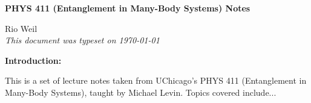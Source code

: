 \documentclass[10pt]{article}
\begin{document}
\begin{tcolorbox}
  \begin{center}
  \begin{Large}
    \textbf{PHYS 411 (Entanglement in Many-Body Systems) Notes} \\
    \vspace{5pt}
  \end{Large}
  \begin{large}
        Rio Weil \\
\vspace{5pt}
    \emph{This document was typeset on \today}
  \end{large}
  \end{center}
\end{tcolorbox}

\begin{center}
  \textbf{Introduction:}

  This is a set of lecture notes taken from UChicago's PHYS 411 (Entanglement in Many-Body Systems), taught by Michael Levin. Topics covered include...

\end{center}
\tableofcontents

\newpage

\end{document}
